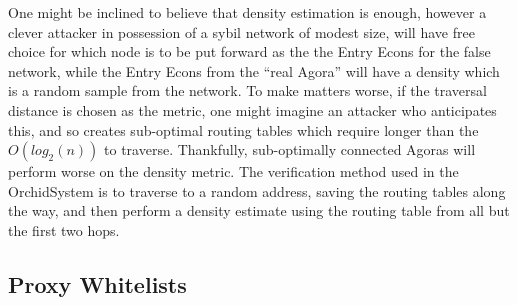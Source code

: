\documentclass{article}
\newcommand{\orchid}{Orchid}
\newcommand{\Orchid}{\orchid}
\begin{document}
One might be inclined to believe that density estimation is enough, however a clever attacker in possession of a sybil network of modest size, will have free choice for which node is to be put forward as the the Entry Econs for the false network, while the Entry Econs from the ``real Agora'' will have a density which is a random sample from the network. To make matters worse, if the traversal distance is chosen as the metric, one might imagine an attacker who anticipates this, and so creates sub-optimal routing tables which require longer than the $O(log_2(n))$ to traverse. Thankfully, sub-optimally connected Agoras will perform worse on the density metric. The verification method used in the \Orchid System is to traverse to a random address, saving the routing tables along the way, and then perform a density estimate using the routing table from all but the first two hops.






\subsection{Proxy Whitelists}
\end{document}

